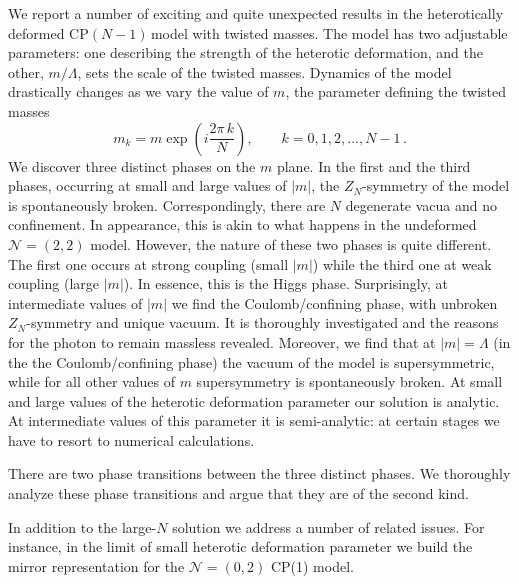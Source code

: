 \documentclass[epsfig,12pt]{article}
\newcommand{\cpn}{CP$(N-1)\,$}
\newcommand{\zn}{$Z_N$}
\newcommand{\ntwot}{${\mathcal N}= \left(2,2\right) $ }
\newcommand{\ntwoo}{${\mathcal N}= \left(0,2\right) $ }
\begin{document}
We report a number of exciting and quite unexpected results in the heterotically deformed \cpn model
with twisted masses. The model has two adjustable parameters:
one describing the strength of the heterotic deformation, and the other, $m/\Lambda$,
sets the scale of the twisted masses. 
Dynamics of the model drastically changes as we vary the value of $m$, the parameter
defining the 
 twisted masses
$$
m_k = m \exp\left(i\frac{2\pi \,k}{N}
\right),\qquad k=0,1,2,..., N-1\,.
$$
We discover three distinct phases on the $m$ plane. In the first and the third phases,
occurring at small and large values of $|m|$, the
\zn-symmetry of the model is spontaneously broken. Correspondingly,
there are $N$ degenerate vacua and no confinement. In appearance, this is akin 
to what happens in the undeformed \ntwot model. 
However, the nature of these two phases is quite different. The first one occurs
at strong  coupling (small $|m|$) while the third one at weak coupling
(large $|m|$). In essence, this is the Higgs phase.
Surprisingly, at intermediate values of $|m|$ we find the Coulomb/confining phase, with unbroken
\zn-symmetry and unique vacuum. It is thoroughly investigated
and the reasons for the photon to remain massless revealed. Moreover, we find that at $|m|=\Lambda$
(in the  the Coulomb/confining phase) the vacuum of the model is supersymmetric, while
for all other values of $m$ supersymmetry is spontaneously broken.
At small and large values of the heterotic deformation parameter our solution is analytic.
At intermediate values of this parameter it is semi-analytic:
at certain stages we have to resort to numerical calculations. 

There are two phase transitions between the three distinct phases. We
thoroughly analyze these phase transitions and argue that they are of the second kind.

In addition to the large-$N$ solution we address a number of related issues. For instance, in the limit
of  small
heterotic deformation parameter we build the mirror representation for the \ntwoo CP(1) model.
\end{document}
